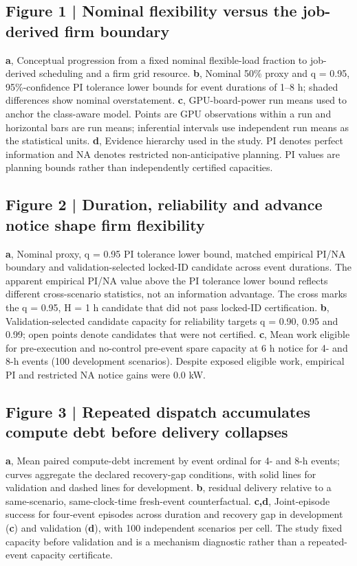 \documentclass[10pt,a4paper]{article}
\begin{document}
\subsection*{Figure 1 | Nominal flexibility versus the job-derived firm boundary}

\textbf{a}, Conceptual progression from a fixed nominal flexible-load fraction to job-derived scheduling and a firm grid resource. \textbf{b}, Nominal 50\% proxy and q = 0.95, 95\%-confidence PI tolerance lower bounds for event durations of 1–8 h; shaded differences show nominal overstatement. \textbf{c}, GPU-board-power run means used to anchor the class-aware model. Points are GPU observations within a run and horizontal bars are run means; inferential intervals use independent run means as the statistical units. \textbf{d}, Evidence hierarchy used in the study. PI denotes perfect information and NA denotes restricted non-anticipative planning. PI values are planning bounds rather than independently certified capacities.


\subsection*{Figure 2 | Duration, reliability and advance notice shape firm flexibility}

\textbf{a}, Nominal proxy, q = 0.95 PI tolerance lower bound, matched empirical PI/NA boundary and validation-selected locked-ID candidate across event durations. The apparent empirical PI/NA value above the PI tolerance lower bound reflects different cross-scenario statistics, not an information advantage. The cross marks the q = 0.95, H = 1 h candidate that did not pass locked-ID certification. \textbf{b}, Validation-selected candidate capacity for reliability targets q = 0.90, 0.95 and 0.99; open points denote candidates that were not certified. \textbf{c}, Mean work eligible for pre-execution and no-control pre-event spare capacity at 6 h notice for 4- and 8-h events (100 development scenarios). Despite exposed eligible work, empirical PI and restricted NA notice gains were 0.0 kW.


\subsection*{Figure 3 | Repeated dispatch accumulates compute debt before delivery collapses}

\textbf{a}, Mean paired compute-debt increment by event ordinal for 4- and 8-h events; curves aggregate the declared recovery-gap conditions, with solid lines for validation and dashed lines for development. \textbf{b}, residual delivery relative to a same-scenario, same-clock-time fresh-event counterfactual. \textbf{c,d}, Joint-episode success for four-event episodes across duration and recovery gap in development (\textbf{c}) and validation (\textbf{d}), with 100 independent scenarios per cell. The study fixed capacity before validation and is a mechanism diagnostic rather than a repeated-event capacity certificate.
\end{document}
